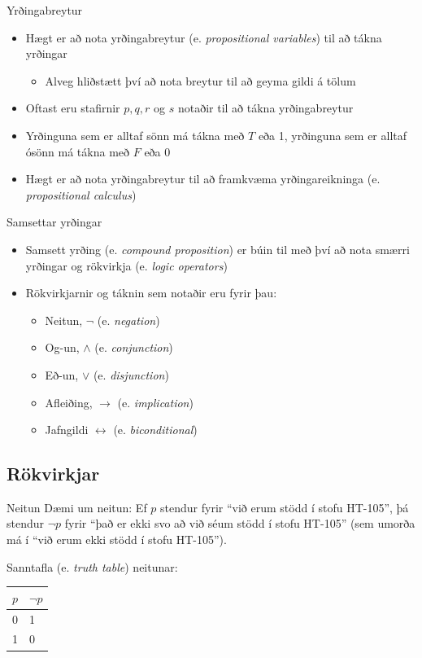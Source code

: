 \documentclass[handout]{beamer}
\begin{document}
\begin{frame}{Yrðingabreytur}
\begin{itemize}
 \item Hægt er að nota yrðingabreytur (e. \emph{propositional variables}) til að tákna yrðingar
 \begin{itemize}
  \item Alveg hliðstætt því að nota breytur til að geyma gildi á tölum
 \end{itemize}
 \item Oftast eru stafirnir $p, q, r$ og $s$ notaðir til að tákna yrðingabreytur
 \item Yrðinguna sem er alltaf sönn má tákna með $T$ eða 1, yrðinguna sem er alltaf ósönn má tákna með $F$ eða 0
 \item Hægt er að nota yrðingabreytur til að framkvæma yrðingareikninga (e. \emph{propositional calculus})
\end{itemize}
\end{frame}

\begin{frame}{Samsettar yrðingar}
\begin{itemize}
 \item Samsett yrðing (e. \emph{compound proposition}) er búin til með því að nota smærri yrðingar og rökvirkja (e. \emph{logic operators})
 \item Rökvirkjarnir og táknin sem notaðir eru fyrir þau:
 \begin{itemize}
  \item Neitun, $\lnot$ (e. \emph{negation})
  \item Og-un, $\land$ (e. \emph{conjunction})
  \item Eð-un, $\lor$ (e. \emph{disjunction})
  \item Afleiðing, $\to$ (e. \emph{implication})
  \item Jafngildi $\leftrightarrow$ (e. \emph{biconditional})
 \end{itemize}
\end{itemize}
\end{frame}

\subsection{Rökvirkjar}

\begin{frame}{Neitun}
Dæmi um neitun: Ef $p$ stendur fyrir ``við erum stödd í stofu HT-105'', þá stendur $\lnot p$ fyrir ``það er ekki svo að við séum stödd í stofu HT-105'' (sem umorða má í ``við erum ekki stödd í stofu HT-105'').

\vspace*{0.5cm}
Sanntafla (e. \emph{truth table}) neitunar:

\begin{center}
\begin{tabular}{ll}
\toprule
$p$&$\lnot p$\\
\midrule
0&1\\
1&0\\
\bottomrule
\end{tabular}
\end{center}
\end{frame}
\end{document}
